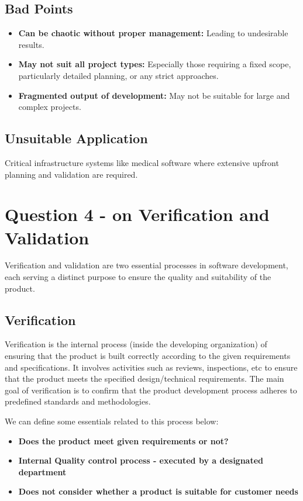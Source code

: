 \documentclass[12pt,a4paper]{article}
\begin{document}
\subsection{Bad Points}
\begin{itemize}
    \item \textbf{Can be chaotic without proper management:} Leading to undesirable results.
    \item \textbf{May not suit all project types:} Especially those requiring a fixed scope, particularly detailed planning, or any strict approaches.
    \item \textbf{Fragmented output of development:} May not be suitable for large and complex projects.
\end{itemize}

\subsection{Unsuitable Application}
Critical infrastructure systems like medical software where extensive upfront planning and validation are required.


\section{Question 4 - on Verification and Validation}

Verification and validation are two essential processes in software development, each serving a distinct purpose to ensure the quality and suitability of the product.

\subsection{Verification}
Verification is the internal process (inside the developing organization) of ensuring that the product is built correctly according to the given requirements and specifications. It involves activities such as reviews, inspections, etc to ensure that the product meets the specified design/technical requirements. The main goal of verification is to confirm that the product development process adheres to predefined standards and methodologies.

We can define some essentials related to this process below:

\begin{itemize}
    \item \textbf{Does the product meet given requirements or not?}
    \item \textbf{Internal Quality control process - executed by a designated department}
    \item \textbf{Does not consider whether a product is suitable for customer needs}
\end{itemize}
\end{document}
